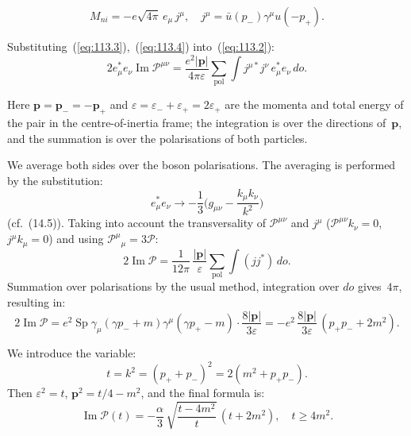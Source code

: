 \begin{equation}
M_{ni} = -e\sqrt{4\pi}\,e_\mu\,j^\mu, \quad j^\mu = \bar{u}(p_-)\gamma^\mu u(-p_+).
\label{eq:113.4}
\end{equation}

Substituting~(\ref{eq:113.3}),~(\ref{eq:113.4}) into~(\ref{eq:113.2}):
\begin{equation}
2e^*_\mu e_\nu \operatorname{Im}\mathcal{P}^{\mu\nu} = \frac{e^2|\mathbf{p}|}{4\pi\varepsilon} \sum_{\mathrm{pol}} \int j^{\mu*} j^\nu\,e^*_\mu e_\nu\,do.
\label{eq:113.5}
\end{equation}


\noindent Here $\mathbf{p} = \mathbf{p}_- = -\mathbf{p}_+$ and $\varepsilon = \varepsilon_- + \varepsilon_+ = 2\varepsilon_+$ are the momenta and total energy of the pair in the centre-of-inertia frame; the integration is over the directions of~$\mathbf{p}$, and the summation is over the polarisations of both particles.

We average both sides over the boson polarisations. The averaging is performed by the substitution:
\begin{equation}
e^*_\mu e_\nu \to -\frac{1}{3}\biggl(g_{\mu\nu} - \frac{k_\mu k_\nu}{k^2}\biggr)
\label{eq:113.6}
\end{equation}
(cf.~(14.5)). Taking into account the transversality of $\mathcal{P}^{\mu\nu}$ and $j^\mu$ ($\mathcal{P}^{\mu\nu}k_\nu = 0$, $j^\mu k_\mu = 0$) and using $\mathcal{P}^\mu{}_\mu = 3\mathcal{P}$:
\begin{equation}
2\operatorname{Im}\mathcal{P} = \frac{1}{12\pi}\,\frac{|\mathbf{p}|}{\varepsilon} \sum_{\mathrm{pol}} \int (jj^*)\,do.
\label{eq:113.7}
\end{equation}
Summation over polarisations by the usual method, integration over $do$ gives~$4\pi$, resulting in:
\[
2\operatorname{Im}\mathcal{P} = e^2\operatorname{Sp}\gamma_\mu(\gamma p_- + m)\gamma^\mu(\gamma p_+ - m) \cdot \frac{8|\mathbf{p}|}{3\varepsilon} = -e^2\,\frac{8|\mathbf{p}|}{3\varepsilon}\,(p_+ p_- + 2m^2).
\]

We introduce the variable:
\begin{equation}
t = k^2 = (p_+ + p_-)^2 = 2(m^2 + p_+ p_-).
\label{eq:113.8}
\end{equation}
Then $\varepsilon^2 = t$, $\mathbf{p}^2 = t/4 - m^2$, and the final formula is:
\begin{equation}
\operatorname{Im}\mathcal{P}(t) = -\frac{\alpha}{3}\,\sqrt{\frac{t - 4m^2}{t}}\,(t + 2m^2), \quad t \geq 4m^2.
\label{eq:113.9}
\end{equation}

